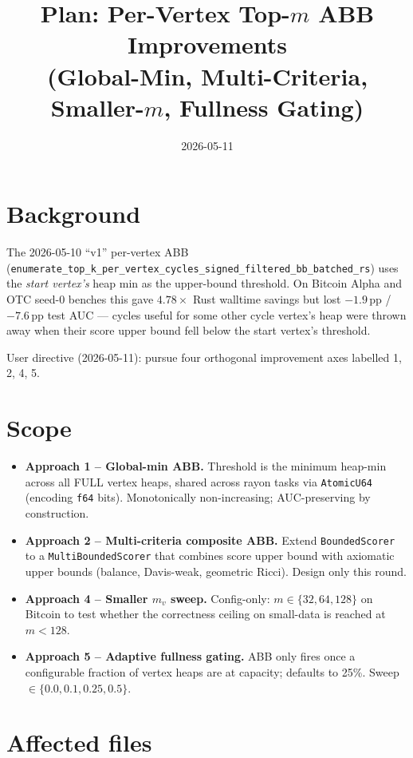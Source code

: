 \documentclass[10pt]{article}
\title{Plan: Per-Vertex Top-$m$ ABB Improvements\\
  (Global-Min, Multi-Criteria, Smaller-$m$, Fullness Gating)}
\author{}
\date{2026-05-11}
\begin{document}
\maketitle

\section*{Background}

The 2026-05-10 ``v1'' per-vertex ABB
(\texttt{enumerate\_top\_k\_per\_vertex\_cycles\_signed\_filtered\_bb\_batched\_rs})
uses the \emph{start vertex's} heap min as the upper-bound threshold.
On Bitcoin Alpha and OTC seed-0 benches this gave $4.78\times$ Rust
walltime savings but lost $-1.9$\,pp / $-7.6$\,pp test AUC --- cycles
useful for some other cycle vertex's heap were thrown away when their
score upper bound fell below the start vertex's threshold.

User directive (2026-05-11): pursue four orthogonal improvement axes
labelled 1, 2, 4, 5.

\section*{Scope}

\begin{itemize}
  \item \textbf{Approach 1 -- Global-min ABB.} Threshold is the
    minimum heap-min across all FULL vertex heaps, shared across
    rayon tasks via \texttt{AtomicU64} (encoding \texttt{f64} bits).
    Monotonically non-increasing; AUC-preserving by construction.
  \item \textbf{Approach 2 -- Multi-criteria composite ABB.} Extend
    \texttt{BoundedScorer} to a \texttt{MultiBoundedScorer} that
    combines score upper bound with axiomatic upper bounds (balance,
    Davis-weak, geometric Ricci). Design only this round.
  \item \textbf{Approach 4 -- Smaller $m_v$ sweep.} Config-only:
    $m \in \{32, 64, 128\}$ on Bitcoin to test whether the
    correctness ceiling on small-data is reached at $m{<}128$.
  \item \textbf{Approach 5 -- Adaptive fullness gating.} ABB only
    fires once a configurable fraction of vertex heaps are at
    capacity; defaults to 25\%. Sweep $\in \{0.0, 0.1, 0.25, 0.5\}$.
\end{itemize}

\section*{Affected files}
\end{document}
